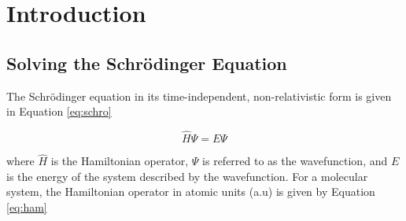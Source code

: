 \documentclass[12pt]{report}
\begin{document}
%
%
%
%
%
%
%
%
%
%
%
%
%
%
%
%
%
%
%
%
%
%
%
%
%
%
%
%
%
%
%
%
%
%
%
%
%
%
%

\bodyoftext

\chapter{Introduction}
\section{Solving the Schr\"{o}dinger Equation}
The Schr\"{o}dinger equation\cite{1926PhRv...28.1049S} in its time-independent, non-relativistic form is given in Equation \ref{eq:schro} 

\begin{equation}
\label{eq:schro}
\hat{H}\Psi = E\Psi
\end{equation} 

where $\hat{H}$ is the Hamiltonian operator, $\Psi$ is referred to as the wavefunction, and $E$ is the energy of the system described by the wavefunction. For a molecular system, the Hamiltonian operator in atomic units (a.u) is given by Equation \ref{eq:ham}
\end{document}
